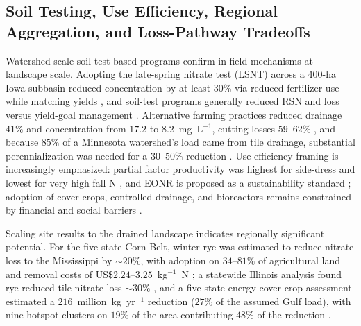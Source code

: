 \documentclass[11pt]{article}
\begin{document}
\subsection{Soil Testing, Use Efficiency, Regional Aggregation, and Loss-Pathway Tradeoffs}

Watershed-scale soil-test-based programs confirm in-field mechanisms at
landscape scale. Adopting the late-spring nitrate test (LSNT) across a 400-ha
Iowa subbasin reduced concentration by at least $30\%$ via reduced fertilizer
use while matching yields \parencite{Jaynes2004,Karlen2005,Malone2010}, and
soil-test programs generally reduced RSN and loss versus yield-goal management
\parencite{Dinnes2002,Ritter2015}. Alternative farming practices reduced
drainage $41\%$ and concentration from $17.2$ to $8.2$~mg~L$^{-1}$, cutting
losses $59$--$62\%$ \parencite{Oquist2007}, and because $85\%$ of a Minnesota
watershed's load came from tile drainage, substantial perennialization was
needed for a $30$--$50\%$ reduction \parencite{Wilson2023,Makhtoumi2025}. Use
efficiency framing is increasingly emphasized: partial factor productivity was
highest for side-dress and lowest for very high fall N \parencite{Jaynes2015},
and EONR is proposed as a sustainability standard \parencite{Bandura2025};
adoption of cover crops, controlled drainage, and bioreactors remains
constrained by financial and social barriers \parencite{David2015}.

Scaling site results to the drained landscape indicates regionally significant
potential. For the five-state Corn Belt, winter rye was estimated to reduce
nitrate loss to the Mississippi by $\sim20\%$, with adoption on
$34$--$81\%$ of agricultural land and removal costs of
US\$$2.24$--$3.25$~kg$^{-1}$~N \parencite{Kladivko2014}; a statewide Illinois
analysis found rye reduced tile nitrate loss $\sim30\%$
\parencite{Gupta2023b}, and a five-state energy-cover-crop assessment
estimated a $216$~million~kg~yr$^{-1}$ reduction ($27\%$ of the assumed Gulf
load), with nine hotspot clusters on $19\%$ of the area contributing $48\%$ of
the reduction \parencite{Malone2023}.
\end{document}
